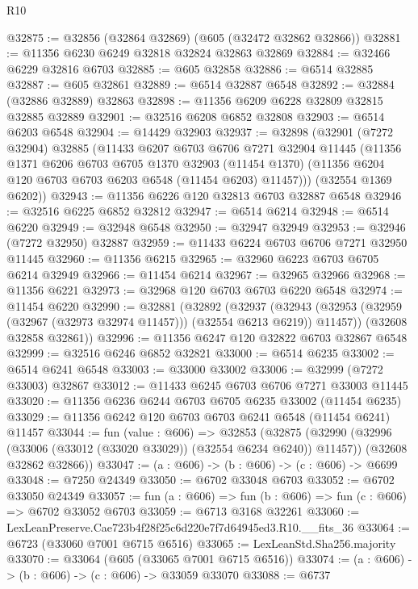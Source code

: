 \begin{lexlean}{R10}
\begin{coremodule}
@32875 := @32856 (@32864 @32869) (@605 (@32472 @32862 @32866))
@32881 := @11356 @6230 @6249 @32818 @32824 @32863 @32869
@32884 := @32466 @6229 @32816 @6703
@32885 := @605 @32858
@32886 := @6514 @32885
@32887 := @605 @32861
@32889 := @6514 @32887 @6548
@32892 := @32884 (@32886 @32889) @32863
@32898 := @11356 @6209 @6228 @32809 @32815 @32885 @32889
@32901 := @32516 @6208 @6852 @32808
@32903 := @6514 @6203 @6548
@32904 := @14429 @32903
@32937 := @32898
    (@32901
      (@7272 @32904)
      @32885
      (@11433
        @6207
        @6703
        @6706
        @7271
        @32904
        @11445
        (@11356
          @1371
          @6206
          @6703
          @6705
          @1370
          @32903
          (@11454 @1370)
          (@11356 @6204 @120 @6703 @6703 @6203 @6548 (@11454 @6203) @11457)))
      (@32554 @1369 @6202))
@32943 := @11356 @6226 @120 @32813 @6703 @32887 @6548
@32946 := @32516 @6225 @6852 @32812
@32947 := @6514 @6214
@32948 := @6514 @6220
@32949 := @32948 @6548
@32950 := @32947 @32949
@32953 := @32946 (@7272 @32950) @32887
@32959 := @11433 @6224 @6703 @6706 @7271 @32950 @11445
@32960 := @11356 @6215
@32965 := @32960 @6223 @6703 @6705 @6214 @32949
@32966 := @11454 @6214
@32967 := @32965 @32966
@32968 := @11356 @6221
@32973 := @32968 @120 @6703 @6703 @6220 @6548
@32974 := @11454 @6220
@32990 := @32881
    (@32892
      (@32937
        (@32943 (@32953 (@32959 (@32967 (@32973 @32974 @11457))) (@32554 @6213 @6219)) @11457))
      (@32608 @32858 @32861))
@32996 := @11356 @6247 @120 @32822 @6703 @32867 @6548
@32999 := @32516 @6246 @6852 @32821
@33000 := @6514 @6235
@33002 := @6514 @6241 @6548
@33003 := @33000 @33002
@33006 := @32999 (@7272 @33003) @32867
@33012 := @11433 @6245 @6703 @6706 @7271 @33003 @11445
@33020 := @11356 @6236 @6244 @6703 @6705 @6235 @33002 (@11454 @6235)
@33029 := @11356 @6242 @120 @6703 @6703 @6241 @6548 (@11454 @6241) @11457
@33044 := fun (value : @606) =>
  @32853
    (@32875
      (@32990 (@32996 (@33006 (@33012 (@33020 @33029)) (@32554 @6234 @6240)) @11457))
      (@32608 @32862 @32866))
@33047 := (a : @606) -> (b : @606) -> (c : @606) -> @6699
@33048 := @7250 @24349
@33050 := @6702 @33048 @6703
@33052 := @6702 @33050 @24349
@33057 := fun (a : @606) => fun (b : @606) => fun (c : @606) => @6702 @33052 @6703
@33059 := @6713 @3168 @32261
@33060 := LexLeanPreserve.Cae723b4f28f25c6d220e7f7d64945ed3.R10.__fits_36
@33064 := @6723 (@33060 @7001 @6715 @6516)
@33065 := LexLeanStd.Sha256.majority
@33070 := @33064 (@605 (@33065 @7001 @6715 @6516))
@33074 := (a : @606) -> (b : @606) -> (c : @606) -> @33059 @33070
@33088 := @6737

\end{coremodule}
\end{lexlean}
